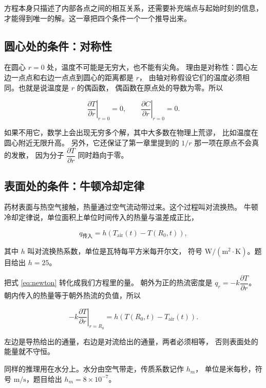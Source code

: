 方程本身只描述了内部各点之间的相互关系，还需要补充端点与起始时刻的信息，
才能得到唯一的解。这一章把四个条件一个一个推导出来。

\subsection{圆心处的条件：对称性}

在圆心 $r=0$ 处，温度不可能是无穷大，也不能有尖角。
理由是对称性：圆心左边一点点和右边一点点到圆心的距离都是 $r$，
由轴对称假设它们的温度必须相同。也就是说温度是 $r$ 的偶函数，
偶函数在原点处的导数为零。所以

\begin{equation}
\left.\frac{\partial T}{\partial r}\right|_{r=0}=0,
\qquad
\left.\frac{\partial C}{\partial r}\right|_{r=0}=0 .
\label{eq:sym}
\end{equation}

如果不用它，数学上会出现无穷多个解，其中大多数在物理上荒谬，
比如温度在圆心附近无限升高。
另外，它还保证了第一章里提到的 $1/r$ 那一项在原点不会真的发散，
因为分子 $\dfrac{\partial T}{\partial r}$ 同时趋向于零。

\subsection{表面处的条件：牛顿冷却定律}

药材表面与热空气接触，热量通过空气流动带过来。这个过程叫对流换热。
牛顿冷却定律说，单位面积上单位时间传入的热量与温差成正比，

\begin{equation}
q_{\text{传入}} = h\left(T_{\mathrm{air}}(t)-T(R_0,t)\right),
\label{eq:newton}
\end{equation}

其中 $h$ 叫对流换热系数，单位是瓦特每平方米每开尔文，
符号 $\mathrm{W/(m^2\cdot K)}$。题目给出 $h=25$。

把式 \eqref{eq:newton} 转化成我们方程里的量。
朝外为正的热流密度是 $q_r=-k\dfrac{\partial T}{\partial r}$。
朝内传入的热量等于朝外热流的负值，所以

\begin{equation}
-k\left.\frac{\partial T}{\partial r}\right|_{r=R_0}
= h\left(T(R_0,t)-T_{\mathrm{air}}(t)\right).
\label{eq:robinT}
\end{equation}

左边是导热给出的通量，右边是对流给出的通量，两者必须相等，
否则表面处的能量就不守恒。

同样的推理用在水分上。水分由空气带走，传质系数记作 $h_m$，
单位是米每秒，符号 $\mathrm{m/s}$，题目给出 $h_m=8\times10^{-7}$。

